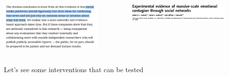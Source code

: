\documentclass[aspectratio=169]{beamer}
\begin{document}
\begin{frame}

\begin{columns}

\begin{column}{0.5\textwidth}
\begin{center}
\includegraphics[width=0.8\textwidth]{figures/pennycook_right_2020_pullquote2}
\end{center}
\end{column}

\begin{column}{0.5\textwidth}
\begin{center}
\includegraphics[width=0.8\textwidth]{figures/kramer_experimental_2014_title}
\end{center}
\end{column}

\end{columns}

\end{frame}
\begin{frame}

Let's see some interventions that can be tested

\end{frame}
\end{document}
